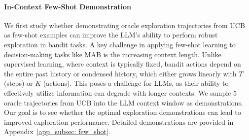 \documentclass[11pt, logo]{googledeepmind}
\theoremstyle{plain}
\theoremstyle{definition}
\begin{document}
\paragraph{In-Context Few-Shot Demonstration}
We first study whether demonstrating oracle exploration trajectories from UCB as few-shot examples can improve the LLM's ability to perform robust exploration in bandit tasks.
A key challenge in applying few-shot learning to decision-making tasks like MAB is the increasing context length. Unlike supervised learning, where context is typically fixed, bandit actions depend on the entire past history or condensed history, which either grows linearly with $T$ (steps) or $K$ (actions). This poses a challenge for LLMs, as their ability to effectively utilize information can degrade with longer contexts.
We sample 5 oracle trajectories from UCB into the LLM context window as demonstrations. Our goal is to see whether the optimal exploration demonstrations can lead to improved exploration performance. Detailed demonstrations are provided in Appendix~\ref{app_subsec: few_shot}.
\end{document}
